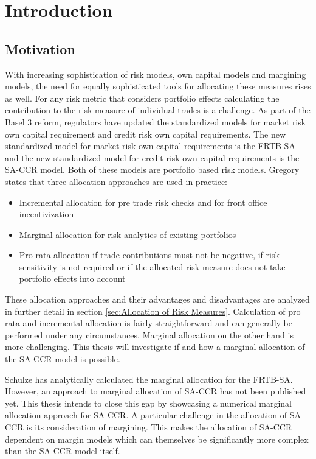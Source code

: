 \documentclass[../Thesis_AHoecherl.tex]{subfiles}
\begin{document}
    \chapter{Introduction}
    \section{Motivation}
    With increasing sophistication of risk models, own capital models and margining models, the need for equally sophisticated tools for allocating these measures rises as well. For any risk metric that considers portfolio effects calculating the contribution to the risk measure of individual trades is a challenge. As part of the Basel 3 reform, regulators have updated the standardized models for market risk own capital requirement and credit risk own capital requirements. The new standardized model for market risk own capital requirements is the \gls{FRTB-SA} and the new standardized model for credit risk own capital requirements is the \gls{SA-CCR} model. Both of these models are portfolio based risk models. Gregory \cite[Chapter~10.7]{gregory2015xva} states that three allocation approaches are used in practice:

    \begin{itemize}
        \item Incremental allocation for pre trade risk checks and for front office incentivization  
        \item Marginal allocation for risk analytics of existing portfolios 
        \item Pro rata allocation if trade contributions must not be negative, if risk sensitivity is not required or if the allocated risk measure does not take portfolio effects into account
    \end{itemize}

    These allocation approaches and their advantages and disadvantages are analyzed in further detail in section \ref{sec:Allocation of Risk Measures}. Calculation of pro rata and incremental allocation is fairly straightforward and can generally be performed under any circumstances. Marginal allocation on the other hand is more challenging. This thesis will investigate if and how a marginal allocation of the \gls{SA-CCR} model is possible.

    Schulze \cite{schulze2018capital} has analytically calculated the marginal allocation for the FRTB-SA. However, an approach to marginal allocation of \gls{SA-CCR} has not been published yet. This thesis intends to close this gap by showcasing a numerical marginal allocation approach for \gls{SA-CCR}. A particular challenge in the allocation of \gls{SA-CCR} is its consideration of margining. This makes the allocation of \gls{SA-CCR} dependent on margin models which can themselves be significantly more complex than the \gls{SA-CCR} model itself.
\end{document}
